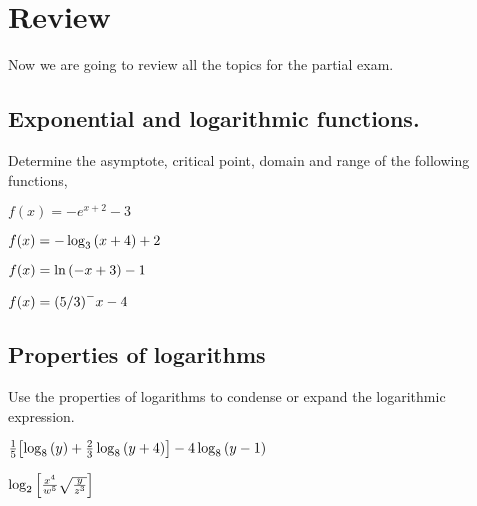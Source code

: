 \documentclass[../main.tex]{subfiles}
\begin{document}
\section{Review}

Now we are going to review all the topics for the partial exam.

\subsection{Exponential and logarithmic functions.}
Determine the asymptote, critical point, domain and range of the following functions,
\begin{enumerate}[label=\alph*]
    \begin{minipage}[c]{0.45\textwidth}
    \item $f(x) = -e^{x+2}-3$
    \item $f(x) = -\log_3\qty(x+4)+2$
    \end{minipage}
    \hfill
    \begin{minipage}[c]{0.45\textwidth}
    \item $f(x) = \ln\qty(-x+3)-1$
    \item $f(x) = \qty(5/3)^-x-4$
    \end{minipage}
\end{enumerate}

\subsection{Properties of logarithms}
Use the properties of logarithms to condense or expand the logarithmic expression.
\begin{enumerate}[label=\alph*]
    \begin{minipage}[c]{0.45\textwidth}
        \item $\frac{1}{5}\qty[\log_8\qty(y)+\frac{2}{3}\log_8\qty(y+4)]-4\log_8\qty(y-1)$
    \end{minipage}
    \hfill
    \begin{minipage}[c]{0.45\textwidth}
    \item $\log_2\qty[\frac{x^4}{w^5}\sqrt{\frac{y}{z^3}}]$
    \end{minipage}
\end{enumerate}
\end{document}
